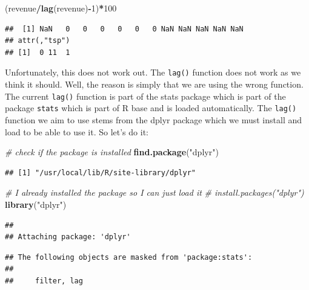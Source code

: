 \documentclass[
  12pt,
  oneside]{book}
\newenvironment{Shaded}{\begin{snugshade}}{\end{snugshade}}
\newcommand{\CommentTok}[1]{\textcolor[rgb]{0.56,0.35,0.01}{\textit{#1}}}
\newcommand{\DecValTok}[1]{\textcolor[rgb]{0.00,0.00,0.81}{#1}}
\newcommand{\FunctionTok}[1]{\textcolor[rgb]{0.13,0.29,0.53}{\textbf{#1}}}
\newcommand{\NormalTok}[1]{#1}
\newcommand{\SpecialCharTok}[1]{\textcolor[rgb]{0.81,0.36,0.00}{\textbf{#1}}}
\newcommand{\StringTok}[1]{\textcolor[rgb]{0.31,0.60,0.02}{#1}}
\theoremstyle{definition}
\theoremstyle{definition}
\theoremstyle{definition}
\theoremstyle{definition}
\theoremstyle{remark}
\begin{document}
\begin{Shaded}
\begin{Highlighting}[]
\NormalTok{(revenue}\SpecialCharTok{/}\FunctionTok{lag}\NormalTok{(revenue)}\SpecialCharTok{{-}}\DecValTok{1}\NormalTok{)}\SpecialCharTok{*}\DecValTok{100} 
\end{Highlighting}
\end{Shaded}

\begin{verbatim}
##  [1] NaN   0   0   0   0   0   0 NaN NaN NaN NaN NaN
## attr(,"tsp")
## [1]  0 11  1
\end{verbatim}

Unfortunately, this does not work out. The \texttt{lag()} function does not work as we think it should. Well, the reason is simply that we are using the wrong function. The current \texttt{lag()} function is part of the stats package which is part of the package \texttt{stats} which is part of R base and is loaded automatically. The \texttt{lag()} function we aim to use stems from the dplyr package which we must install and load to be able to use it. So let's do it:

\begin{Shaded}
\begin{Highlighting}[]
\CommentTok{\# check if the package is installed}
\FunctionTok{find.package}\NormalTok{(}\StringTok{"dplyr"}\NormalTok{)}
\end{Highlighting}
\end{Shaded}

\begin{verbatim}
## [1] "/usr/local/lib/R/site-library/dplyr"
\end{verbatim}

\begin{Shaded}
\begin{Highlighting}[]
\CommentTok{\# I already installed the package so I can just load it}
\CommentTok{\# install.packages("dplyr")}
\FunctionTok{library}\NormalTok{(}\StringTok{"dplyr"}\NormalTok{)}
\end{Highlighting}
\end{Shaded}

\begin{verbatim}
## 
## Attaching package: 'dplyr'
\end{verbatim}

\begin{verbatim}
## The following objects are masked from 'package:stats':
## 
##     filter, lag
\end{verbatim}
\end{document}
